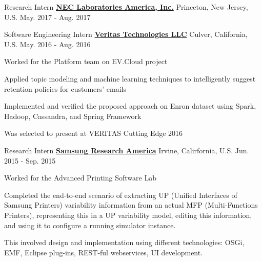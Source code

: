 

\begin{cventries}
\cventry
{Research Intern} %
{\href{http://www.nec-labs.com/}{\bf NEC Laboratories America, Inc.}}  %
{Princeton, New Jersey, U.S.} %
{May. 2017 - Aug. 2017} %
{
}
	
	
\cventry
{Software Engineering Intern} %
{\href{https://www.veritas.com/}{\bf Veritas Technologies LLC}}  %
{Culver, California, U.S.} %
{May. 2016 - Aug. 2016} %
{
	\begin{cvitems} %
		\item Worked for the Platform team on EV.Cloud project
		\item Applied topic modeling and machine learning techniques to intelligently suggest retention policies for customers' emails
		\item Implemented and verified the proposed approach on Enron dataset using Spark, Hadoop, Cassandra, and Spring Framework
		\item Was selected to present at VERITAS Cutting Edge 2016
	\end{cvitems}
}

  \cventry
    {Research Intern} %
    {\href{http://www.sra.samsung.com}{\bf Samsung Research America}} %
    {Irvine, Calirfornia, U.S.} %
    {Jun. 2015 - Sep. 2015} %
    {
      \begin{cvitems} %
        \item Worked for the Advanced Printing Software Lab
        \item Completed the end-to-end scenario of extracting UP (Unified Interfaces of Samsung Printers) variability information from an actual MFP (Multi-Functions Printers), representing this in a UP variability model, editing this information, and using it to configure a running simulator instance. 
        \item This involved design and implementation using different technologies: OSGi, EMF, Eclipse plug-ins, REST-ful webservices, UI development.
      \end{cvitems}
    }


\end{cventries}
